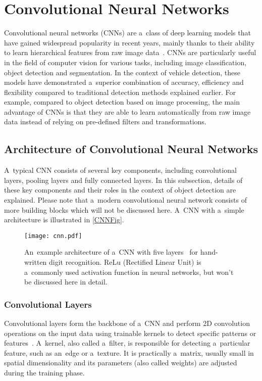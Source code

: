 \section{Convolutional Neural Networks}
\label{CNNs}

Convolutional neural networks (CNNs) are a~class of deep learning models that
have gained widespread popularity in recent years, mainly thanks to their
ability to learn hierarchical features from raw image data~\cite{Li2022}. CNNs
are particularly useful in the field of computer vision for various tasks,
including image classification, object detection and segmentation. In the
context of vehicle detection, these models have demonstrated a~superior
combination of accuracy, efficiency and flexibility compared to traditional
detection methods explained earlier. For example, compared to object detection
based on image processing, the main advantage of CNNs is that they are able to
learn automatically from raw image data instead of relying on pre-defined
filters and transformations.


\subsection{Architecture of Convolutional Neural Networks}

A~typical CNN consists of several key components, including convolutional
layers, pooling layers and fully connected layers. In this subsection, details
of these key components and their roles in the context of object detection are
explained. Please note that a~modern convolutional neural network consists of
more building blocks which will not be discussed here. A~CNN with a~simple
architecture is illustrated in \autoref{CNNFig}.

\begin{figure}[t]
    \centering
    \texttt{[image: cnn.pdf]}
    \captionsetup{width=0.75\textwidth}
    \caption{An~example architecture of a~CNN with five layers~\cite{OShea2015}
    for hand-written digit recognition.  ReLu (Rectified Linear Unit) is
    a~commonly used activation function in neural networks, but won't be
    discussed here in detail.}
    \label{CNNFig}
\end{figure}


\subsubsection{Convolutional Layers}

Convolutional layers form the backbone of a~CNN and perform 2D convolution
operations on the input data using trainable kernels to detect specific patterns
or features~\cite{OShea2015}. A~kernel, also called a~filter, is responsible
for detecting a~particular feature, such as an~edge or a~texture. It is
practically a~matrix, usually small in spatial dimensionality and its
parameters (also called weights) are adjusted during the training phase.


